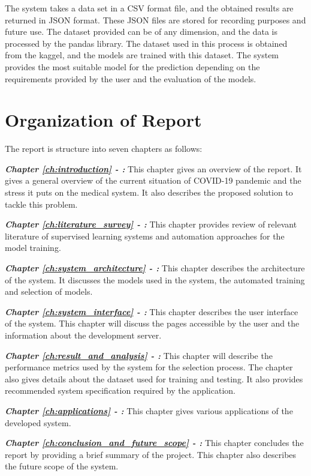 The system takes a data set in a CSV format file, and the obtained results are returned in JSON format. These JSON files are stored for recording purposes and future use. The dataset provided can be of any dimension, and the data is processed by the pandas library. The dataset used in this process is obtained from the kaggel, and the models are trained with this dataset. The system provides the most suitable model for the prediction depending on the requirements provided by the user and the evaluation of the models.

\section{Organization of Report}\label{sec:organization_of_report}

The report is structure into seven chapters as follows:

\textbf{\textit{Chapter \ref{ch:introduction} - :}}
This chapter gives an overview of the report. It gives a general overview of the current situation of COVID-19 pandemic and the stress it puts on the medical system. It also describes the proposed solution to tackle this problem.

\textbf{\textit{Chapter \ref{ch:literature_survey} - :}}
This chapter provides review of relevant literature of supervised learning systems and automation approaches for the model training.

\textbf{\textit{Chapter \ref{ch:system_architecture} - :}}
This chapter describes the architecture of the system. It discusses the models used in the system, the automated training and selection of models.

\textbf{\textit{Chapter \ref{ch:system_interface} - :}}
This chapter describes the user interface of the system. This chapter will discuss the pages accessible by the user and the information about the development server.

\textbf{\textit{Chapter \ref{ch:result_and_analysis} - :}}
This chapter will describe the performance metrics used by the system for the selection process. The chapter also gives details about the dataset used for training and testing. It also provides recommended system specification required by the application.

\textbf{\textit{Chapter \ref{ch:applications} - :}}
This chapter gives various applications of the developed system.

\textbf{\textit{Chapter \ref{ch:conclusion_and_future_scope} - :}}
This chapter concludes the report by providing a brief summary of the project. This chapter also describes the future scope of the system.
